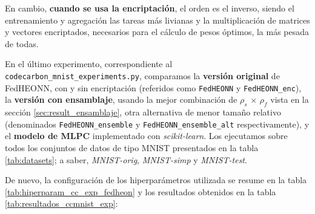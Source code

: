 \documentclass[00-Trabajo_Final.tex]{subfiles}
\begin{document}
En cambio, \textbf{cuando se usa la encriptación}, el orden es el inverso, siendo el entrenamiento y agregación las tareas más livianas y la multiplicación de matrices y vectores encriptados, necesarios para el cálculo de pesos óptimos, la más pesada de todas.

\vspace{1em}

En el último experimento, correspondiente al \verb|codecarbon_mnist_experiments.py|, comparamos la \textbf{versión original} de FedHEONN, con y sin encriptación (referidos como \verb|FedHEONN| y \verb|FedHEONN_enc|), la \textbf{versión con ensamblaje}, usando la mejor combinación de $\rho_s\,\times\,\rho_f$ vista en la sección \ref{sec:result_ensamblaje}, otra alternativa de menor tamaño relativo (denominados \verb|FedHEONN_ensemble| y \verb|FedHEONN_ensemble_alt| respectivamente), y el \textbf{modelo de MLPC} implementado con \textit{scikit-learn}. Los ejecutamos sobre todos los conjuntos de datos de tipo MNIST presentados en la tabla \ref{tab:datasets}; a saber, \textit{MNIST-orig}, \textit{MNIST-simp} y \textit{MNIST-test}.

De nuevo, la configuración de los hiperparámetros utilizada se resume en la tabla \ref{tab:hiperparam_cc_exp_fedheon} y los resultados obtenidos en la tabla \ref{tab:resultados_ccmnist_exp}:
\end{document}
